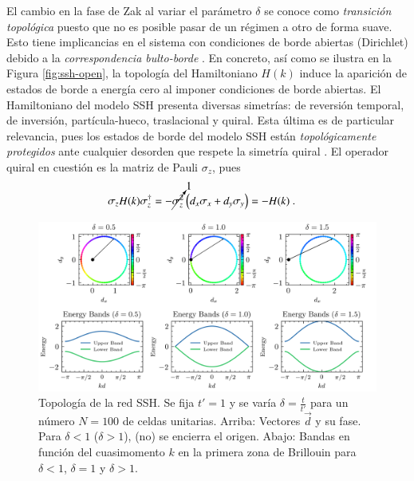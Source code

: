 El cambio en la fase de Zak al variar el parámetro $\delta$  se conoce como \textit{transición topológica} puesto que no es posible pasar de un régimen a otro de forma suave. Esto tiene implicancias en el sistema con condiciones de borde abiertas (Dirichlet) debido a la \textit{correspondencia bulto-borde} \cite{topobulk}. En concreto, así como se ilustra en la Figura \ref{fig:ssh-open}, la topología del Hamiltoniano $H(k)$ induce la aparición de estados de borde a energía cero al imponer condiciones de borde abiertas.
El Hamiltoniano del modelo SSH presenta diversas simetrías: de reversión temporal, de inversión, partícula-hueco, traslacional y quiral. Esta última es de particular relevancia, pues los estados de borde del modelo SSH están \textit{topológicamente protegidos} ante cualquier desorden que respete la simetría quiral \cite{ssh-course}. El operador quiral en cuestión es la matriz de Pauli $\sigma_z$, pues 
\begin{align*}
	\sigma_z H(k) \sigma_z^\dagger &=  -\cancelto{1}{\sigma_z^2} \left(d_x \sigma_x  + d_y \sigma_y\right)  =- H(k) \ .
\end{align*}
\begin{figure}[h]
	\centering
	\includegraphics[width=\linewidth]{media/ssh-winding}
	\caption[Topología de la red SSH.]{Topología de la red SSH. Se fija $t'=1$ y se varía $\delta=\frac{t}{t'}$ para un número $N=100$ de celdas unitarias. Arriba: Vectores $\vec{d}$ y su fase. Para $\delta < 1$ ($\delta > 1$), (no) se encierra el origen. Abajo: Bandas en función del cuasimomento $k$ en la primera zona de Brillouin para $\delta < 1$, $\delta = 1$ y $\delta > 1$. 
	\label{fig:ssh-topo}}
\end{figure} 
